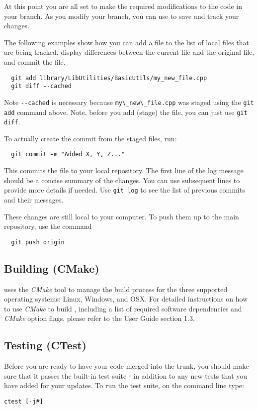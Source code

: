 \begin{itemize}
  At this point you are all set to make the required modifications to the 
  code in your branch.  As you modify your branch, you can use {\GIT} to
  save and track your changes.

  The following examples show how you can add a file to the list of local
  files that are being tracked, display differences between the current
  file and the original file, and commit the file.  
  \begin{lstlisting}
  git add library/LibUtilities/BasicUtils/my_new_file.cpp
  git diff --cached
  \end{lstlisting}

  Note \lstinline{--cached} is necessary because \lstinline{my\_new\_file.cpp} was staged using
  the \lstinline{git add} command above.  Note, before you add (stage) the
  file, you can just use \lstinline{git diff}.
  
  To actually create the commit from the staged files, run:
  \begin{lstlisting}
  git commit -m "Added X, Y, Z..."
  \end{lstlisting}
  This commits the file to your local repository. The first line of the log message should be a concise summary of the changes. You can use subsequent lines to provide more details if needed. Use \lstinline{git log} to see the list of previous commits and their messages.
  
  These changes are still local to your computer. To push them up to the main {\nek} repository, use the command
  \begin{lstlisting}
  git push origin
  \end{lstlisting}
\end{itemize}

\subsection{Building (CMake)}

{\nek} uses the \emph{CMake} tool to manage the build process for
the three supported operating systems: Linux, Windows, and OSX.  For
detailed instructions on how to use \emph{CMake} to build {\nek},
including a list of required software dependencies and \emph{CMake}
option flags, please refer to the {\nek} User Guide section 1.3.

\subsection{Testing (CTest)}
Before you are ready to have your code merged into the {\nek}
trunk, you should make sure that it passes the built-in test suite -
in addition to any new tests that you have added for your
updates. To run the test suite, on the command line type:
\begin{lstlisting}  
ctest [-j#]
\end{lstlisting}
  
